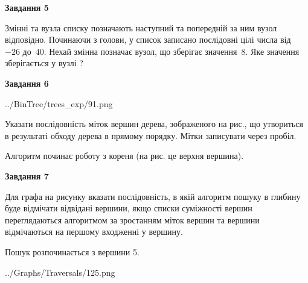 \documentclass[12pt, ukrainian]{article}
\begin{document}
{\begin {large}
{\begin {center}\textbf{Завдання 5}\end {center}}\par
Змінні  та  вузла списку позначають наступний та попередній за ним вузол відповідно. Починаючи з голови, у список записано послідовні цілі числа від~$-26$ до~$40$. Нехай змінна  позначає вузол, що зберігає значення~$8$.
Яке значення зберігається у вузлі  ?\par
\newpage

{\begin {center}\textbf{Завдання 6}\end {center}}\par

\begin{center}
	{../BinTree/trees_exp/91.png}
\end{center}
Указати послідовність міток вершин дерева, зображеного на рис., що утвориться в результаті обходу дерева в прямому порядку. Мітки записувати через пробіл.\par Алгоритм починає роботу з кореня (на рис. це верхня вершина).\par
\newpage

{\begin {center}\textbf{Завдання 7}\end {center}}\par
Для графа на рисунку вказати послідовність, в якій алгоритм пошуку в глибину буде відмічати відвідані вершини, якщо списки суміжності вершин переглядаються алгоритмом за зростанням міток вершин та вершини відмічаються на першому вход\-женні у вершину.\par
Пошук розпочинається з вершини 5.\par

\begin{center}
	{../Graphs/Traversals/125.png}
\end{center}\par
\newpage


\end{large}}
\end{document}
